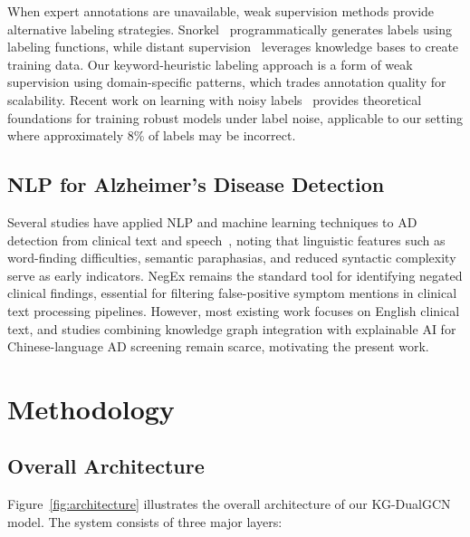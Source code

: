 \documentclass[11pt,onecolumn,a4paper]{article}
\begin{document}
When expert annotations are unavailable, weak supervision methods provide alternative labeling strategies. Snorkel~\cite{ratner2017snorkel} programmatically generates labels using labeling functions, while distant supervision~\cite{mintz2009distant} leverages knowledge bases to create training data. Our keyword-heuristic labeling approach is a form of weak supervision using domain-specific patterns, which trades annotation quality for scalability. Recent work on learning with noisy labels~\cite{natarajan2013learning} provides theoretical foundations for training robust models under label noise, applicable to our setting where approximately 8\% of labels may be incorrect.

\subsection{NLP for Alzheimer's Disease Detection}

Several studies have applied NLP and machine learning techniques to AD detection from clinical text and speech~\cite{weiner2017adni}, noting that linguistic features such as word-finding difficulties, semantic paraphasias, and reduced syntactic complexity serve as early indicators. NegEx \cite{chapman2001negex} remains the standard tool for identifying negated clinical findings, essential for filtering false-positive symptom mentions in clinical text processing pipelines. However, most existing work focuses on English clinical text, and studies combining knowledge graph integration with explainable AI for Chinese-language AD screening remain scarce, motivating the present work.

\section{Methodology}
\label{sec:method}

\subsection{Overall Architecture}

Figure~\ref{fig:architecture} illustrates the overall architecture of our KG-DualGCN model. The system consists of three major layers:
\end{document}
